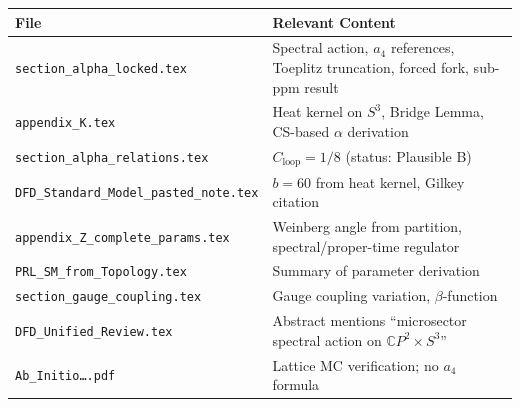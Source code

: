 \documentclass[11pt,a4paper]{article}
\begin{document}
\begin{center}
\small
\begin{tabular}{p{}p{}}
\toprule
\textbf{File} & \textbf{Relevant Content} \\
\midrule
\texttt{section\_alpha\_locked.tex} & Spectral action, $a_4$ references, Toeplitz truncation, forced fork, sub-ppm result \\
\texttt{appendix\_K.tex} & Heat kernel on $S^3$, Bridge Lemma, CS-based $\alpha$ derivation \\
\texttt{section\_alpha\_relations.tex} & $C_{\mathrm{loop}} = 1/8$ (status: Plausible B) \\
\texttt{DFD\_Standard\_Model\_pasted\_note.tex} & $b = 60$ from heat kernel, Gilkey citation \\
\texttt{appendix\_Z\_complete\_params.tex} & Weinberg angle from partition, spectral/proper-time regulator \\
\texttt{PRL\_SM\_from\_Topology.tex} & Summary of parameter derivation \\
\texttt{section\_gauge\_coupling.tex} & Gauge coupling variation, $\beta$-function \\
\texttt{DFD\_Unified\_Review.tex} & Abstract mentions ``microsector spectral action on $\mathbb{C}P^2 \times S^3$'' \\
\texttt{Ab\_Initio\ldots.pdf} & Lattice MC verification; no $a_4$ formula \\
\bottomrule
\end{tabular}
\end{center}
\end{document}
